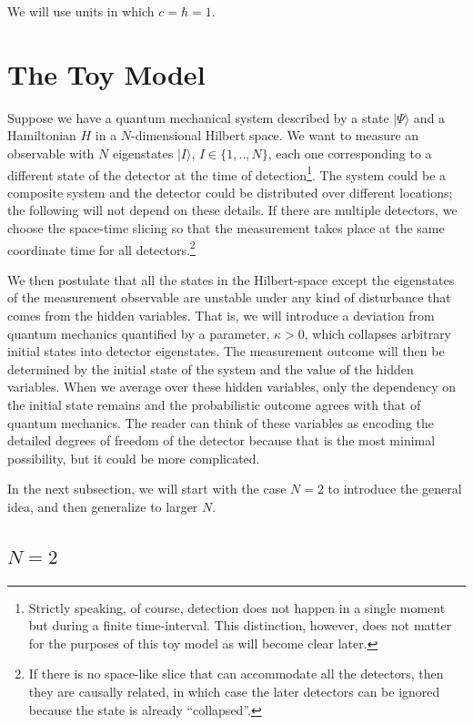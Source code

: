 \documentclass[11pt,twoside,A4]{article}
\begin{document}
 We will use units in which $c= \hbar =1$. 


\section{The Toy Model}

 Suppose we have a quantum mechanical system described by a state $|\Psi \rangle$ and a Hamiltonian $ H$ in a $N$-dimensional Hilbert space. We want to measure an observable with $N$  eigenstates $| I \rangle$, $I \in \{1,.., N\}$, each one corresponding to a different state of the detector at the time of detection\footnote{Strictly speaking, of course, detection does not happen in a single moment but during a finite time-interval.
This distinction, however, does not matter for the purposes of this toy model as will become clear later.}.
The system could be a composite system and the detector could be distributed over different locations; the following will not depend on these details. If there are multiple detectors, we choose the space-time slicing so that the measurement takes place at the same coordinate time for all detectors.\footnote{If there is no space-like slice that can accommodate all the detectors, then they are causally related, in which case the later detectors can be ignored because the state is already ``collapsed''.}

We then postulate that all the states in the Hilbert-space except the eigenstates of the
measurement observable are unstable under any kind of disturbance that comes from the hidden variables. That is, we will introduce a deviation from quantum mechanics quantified by a parameter, $\kappa>0$, which collapses arbitrary initial states into detector eigenstates. The measurement outcome will then be determined by the initial state of the system and the value of the hidden variables. When we average over these hidden variables, only the dependency on the initial state remains and the probabilistic outcome agrees with that of quantum mechanics. The reader can think of these variables as encoding the detailed
degrees of freedom of the detector because that is the most minimal possibility, but it could be more
complicated.

In the next subsection, we will start with the case $N=2$ to introduce the general idea, and then generalize to larger $N$. 

\subsection{$N=2$}
\end{document}
